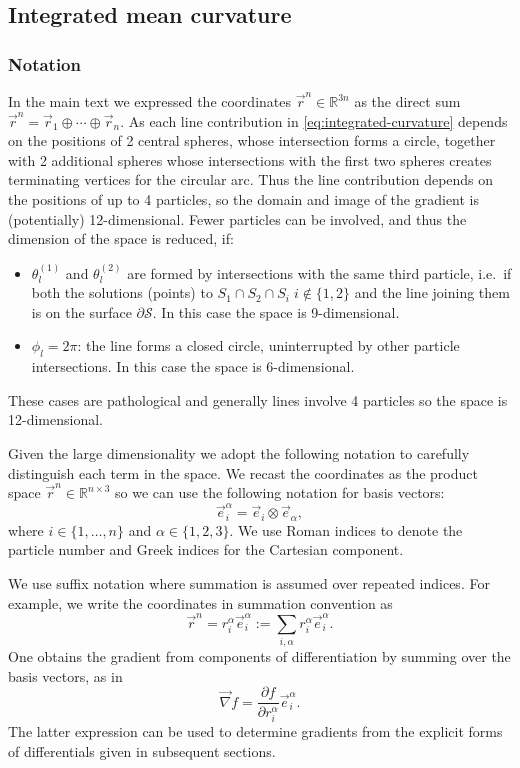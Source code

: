 \subsection{Integrated mean curvature}

\subsubsection{Notation}

In the main text we expressed the coordinates $\vec{r}^n \in \mathbb{R}^{3n}$ as the direct sum $\vec{r}^n = \vec{r}_1 \oplus \cdots \oplus \vec{r}_n$.
As each line contribution in \eqref{eq:integrated-curvature} depends on the positions of 2 central spheres, whose intersection forms a circle, together with 2 additional spheres whose intersections with the first two spheres creates terminating vertices for the circular arc.
Thus the line contribution depends on the positions of up to 4 particles, so the domain and image of the gradient is (potentially) 12-dimensional.
Fewer particles can be involved, and thus the dimension of the space is reduced, if:
\begin{itemize}
  \item $\theta_{l}^{(1)}$ and $\theta_{l}^{(2)}$ are formed by intersections with the same third particle, i.e.\ if both the solutions (points) to $S_1 \cap S_2 \cap S_i \; i \notin \{1, 2\}$ and the line joining them is on the surface $\partial\mathcal{S}$.
  In this case the space is 9-dimensional.
  \item $\phi_l = 2\pi$: the line forms a closed circle, uninterrupted by other particle intersections.
  In this case the space is 6-dimensional.
\end{itemize}
These cases are pathological and generally lines involve 4 particles so the space is 12-dimensional.

Given the large dimensionality we adopt the following notation to carefully distinguish each term in the space.
We recast the coordinates as the product space $\vec{r}^n \in \mathbb{R}^{n \times 3}$ so we can use the following notation for basis vectors:
\begin{equation*}
  \vec{e}_i^\alpha = \vec{e}_i \otimes \vec{e}_\alpha,
\end{equation*}
where $i \in \{1,\dots,n\}$ and $\alpha \in \{1,2,3\}$.
We use Roman indices to denote the particle number and Greek indices for the Cartesian component.

We use suffix notation where summation is assumed over repeated indices.
For example, we write the coordinates in summation convention as
\begin{equation*}
  \vec{r}^n = r_i^\alpha \vec{e}_i^\alpha := \sum_{i,\alpha} r_i^\alpha \vec{e}_i^\alpha.
\end{equation*}
One obtains the gradient from components of differentiation by summing over the basis vectors, as in
\begin{equation*}
  \vec{\nabla} f =
  \frac{\partial f}{\partial r_i^\alpha} \vec{e}_i^\alpha.
\end{equation*}
The latter expression can be used to determine gradients from the explicit forms of differentials given in subsequent sections.

